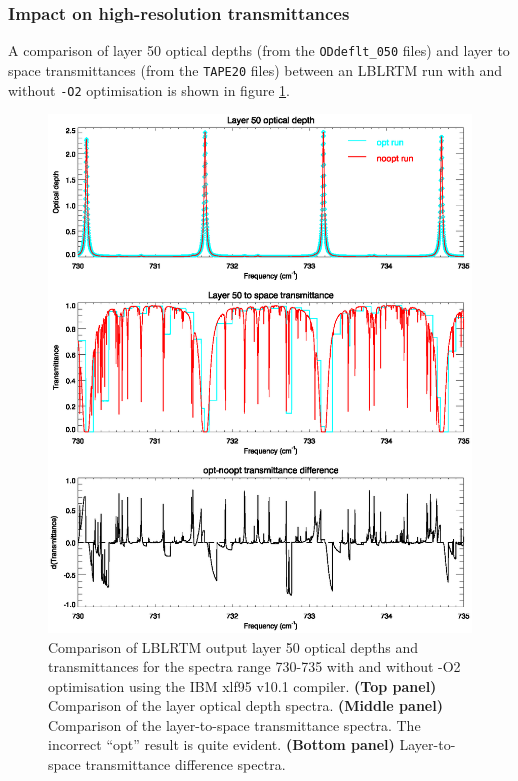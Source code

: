 \subsubsection{Impact on high-resolution transmittances}
A comparison of layer 50 optical depths (from the \texttt{ODdeflt\_050} files) and layer to space transmittances (from the \texttt{TAPE20} files) between an LBLRTM run with and without \texttt{-O2} optimisation is shown in figure \ref{fig:opt-noopt_lyr50_LBLRTM_results}.
\begin{figure}[htp]
  \centering
  \includegraphics[scale=0.8]{graphics/opt-noopt_lyr50_LBLRTM_results.eps}
  \caption{Comparison of LBLRTM output layer 50 optical depths and transmittances for the spectra range 730-735\invcm{} with and without -O2 optimisation using the IBM xlf95 v10.1 compiler. \textbf{(Top panel)} Comparison of the layer optical depth spectra. \textbf{(Middle panel)} Comparison of the layer-to-space transmittance spectra. The incorrect ``opt'' result is quite evident. \textbf{(Bottom panel)} Layer-to-space transmittance difference spectra.}
  \label{fig:opt-noopt_lyr50_LBLRTM_results}
\end{figure}


